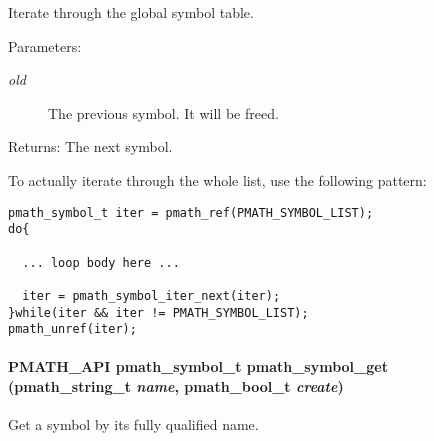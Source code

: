 Iterate through the global symbol table. 

\begin{Desc}
\item[Parameters:]
\begin{description}
\item[{\em old}]The previous symbol. It will be freed. \end{description}
\end{Desc}
\begin{Desc}
\item[Returns:]The next symbol.\end{Desc}
To actually iterate through the whole list, use the following pattern: 

\begin{Code}\begin{verbatim}pmath_symbol_t iter = pmath_ref(PMATH_SYMBOL_LIST);
do{
  
  ... loop body here ...
  
  iter = pmath_symbol_iter_next(iter);
}while(iter && iter != PMATH_SYMBOL_LIST);
pmath_unref(iter);
\end{verbatim}
\end{Code}

 \hypertarget{group__symbols_g0ccb42b30fcf6ee77d91241222f5c033}{
\paragraph[{pmath\_\-symbol\_\-get}]{\setlength{\rightskip}{0pt plus 5cm}PMATH\_\-API {\bf pmath\_\-symbol\_\-t} pmath\_\-symbol\_\-get ({\bf pmath\_\-string\_\-t} {\em name}, \/  {\bf pmath\_\-bool\_\-t} {\em create})}\hfill}
\label{group__symbols_g0ccb42b30fcf6ee77d91241222f5c033}


Get a symbol by its fully qualified name. 

